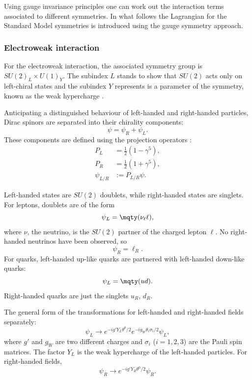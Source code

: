 Using gauge invariance principles one can work out the interaction terms associated to different symmetries. In what follows the Lagrangian for the Standard Model symmetries is introduced using the gauge symmetry approach.
    
\subsubsection*{Electroweak interaction}
For the electroweak interaction, the associated symmetry group is $SU(2)_{L}\times U(1)_{Y}$. The subindex $L$ stands to show that $SU(2)$ acts only on left-chiral states and the subindex $Y$ represents is a parameter of the symmetry, known as the weak hypercharge \cite{goldberg_standard_2017}.

Anticipating a distinguished behaviour of left-handed and right-handed particles, Dirac spinors are separated into their chirality components:
\begin{equation}
    \psi = \psi_R+\psi_L.
\end{equation}
These components are defined using the projection operators \cite{kane_modern_1987}:
\begin{align}
    P_L &= \frac{1}{2}(1-\gamma^5), \\
    P_R &= \frac{1}{2}(1+\gamma^5), \\
    \psi_{L/R} &:= P_{L/R} \psi.
\end{align}
    
Left-handed states are $SU(2)$ doublets, while right-handed states are singlets. For leptons, doublets are of the form
\begin{equation}
    \psi_L = \mqty( \nu_\ell \\ \ell ),
\end{equation}
where $\nu$, the neutrino, is the $SU(2)$ partner of the charged lepton $\ell$. No right-handed neutrinos have been observed, so 
\begin{equation}
    \psi_R = \ell_R.
\end{equation}
For quarks, left-handed up-like quarks are partnered with left-handed down-like quarks:
\begin{equation}
    \psi_L = \mqty( u \\ d ).
\end{equation}
Right-handed quarks are just the singlets $u_R$, $d_R$.

The general form of the transformations for left-handed and right-handed fields separately:
\begin{equation}
    \psi_L \rightarrow e^{-ig'Y_L\theta^0/2}e^{-ig_W\theta_i\sigma_i/2}\psi_L,
\end{equation}
where $g'$ and $g_W$ are two different charges and $\sigma_i$ ($i=1,2,3$) are the Pauli spin matrices. The factor $Y_L$ is the weak hypercharge of the left-handed particles. For right-handed fields,
\begin{equation}
    \psi_R \rightarrow e^{-ig'Y_R\theta^0/2}\psi_R.
\end{equation}

